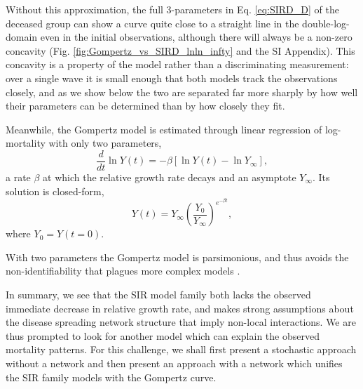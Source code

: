 \documentclass{article}
\begin{document}
Without this approximation, the full 3-parameters in Eq. \ref{eq:SIRD_D} of the deceased group can show a curve quite close to a straight line in the double-log-domain even in the initial observations, although there will always be a non-zero concavity (Fig. \ref{fig:Gompertz_vs_SIRD_lnln_infty} and the SI Appendix). This concavity is a property of the model rather than a discriminating measurement: over a single wave it is small enough that both models track the observations closely, and as we show below the two are separated far more sharply by how well their parameters can be determined than by how closely they fit.

Meanwhile, the Gompertz model is estimated through linear regression of log-mortality \cite{Levitt2020} with only two parameters,
\begin{equation}
\label{eq:GompertzODE2param}
\frac{d}{dt}\ln{Y(t)} = -\beta\left[\ln{Y(t)} - \ln {Y_{\infty}}\right],
\end{equation}
a rate $\beta$ at which the relative growth rate decays and an asymptote $Y_{\infty}$.
Its solution is closed-form,
\begin{equation}
\label{eq:gomp_solution}
Y(t) = Y_\infty \left(\frac{Y_0}{Y_\infty}\right)^{e^{-\beta t}},
\end{equation}
where $Y_{0}=Y(t = 0)$.

With two parameters the Gompertz model is parsimonious, and thus avoids the
non-identifiability that plagues more complex models \cite{roda2020difficult}.

In summary, we see that the SIR model family both lacks the observed immediate decrease in relative growth rate, and makes strong assumptions about the disease spreading network structure that imply non-local interactions. We are thus prompted to look for another model which can explain the observed mortality patterns. For this challenge, we shall first present a stochastic approach without a network and then present an approach with a network which unifies the SIR family models with the Gompertz curve.
\end{document}
